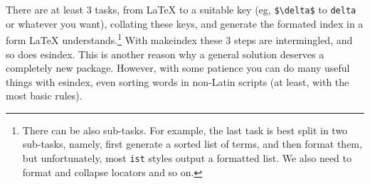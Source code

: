 \documentclass[a4paper]{ltxguide}
\begin{document}
There are at least 3 tasks, from \LaTeX{} to a suitable key (eg,
\verb|$\delta$| to \verb|delta| or whatever you want), collating these
keys, and generate the formated index in a form \LaTeX{}
understands.\footnote{There can be also sub-tasks. For example, the
last task is best split in two sub-tasks, namely, first generate a
sorted list of terms, and then format them, but unfortunately, most
\texttt{ist} styles output a formatted list. We also need to format and
collapse locators and so on.} With \textsf{makeindex} these 3 steps are
intermingled, and so does \textsf{esindex}. This is another reason why
a general solution deserves a completely new package. However, with
some patience you can do many useful things with \textsf{esindex}, even
sorting words in non-Latin scripts (at least, with the most basic
rules).
\end{document}
